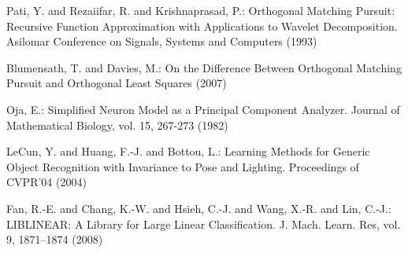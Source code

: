 \documentclass[runningheads,a4paper]{llncs}
\begin{document}
\begin{thebibliography}{4}
 Pati, Y. and Rezaiifar, R. and Krishnaprasad, P.: Orthogonal Matching Pursuit: Recursive Function Approximation with Applications to Wavelet Decomposition. Asilomar Conference on Signals, Systems and Computers (1993)

 Blumensath, T. and Davies, M.: On the Difference Between Orthogonal Matching Pursuit and Orthogonal Least Squares (2007)

 Oja, E.: Simplified Neuron Model as a Principal Component Analyzer. Journal of Mathematical Biology, vol. 15, 267-273 (1982)

 LeCun, Y. and Huang, F.-J. and Bottou, L.: Learning Methods for Generic Object Recognition with Invariance to Pose and Lighting. Proceedings of CVPR'04 (2004)

 Fan, R.-E. and Chang, K.-W. and Hsieh, C.-J. and Wang, X.-R. and Lin, C.-J.: LIBLINEAR: A Library for Large Linear Classification. J. Mach. Learn. Res, vol. 9, 1871--1874 (2008)

\end{thebibliography}
\end{document}
